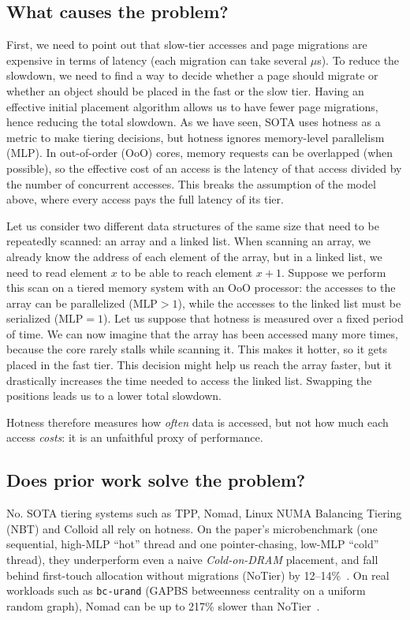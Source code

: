 \documentclass[conference]{IEEEtran}
\begin{document}
\subsection{What causes the problem?}
First, we need to point out that slow-tier accesses and page migrations are expensive in terms of latency (each migration can take several $\mu$s).
To reduce the slowdown, we need to find a way to decide whether a page should migrate or whether an object should be placed in the fast or the slow tier.
Having an effective initial placement algorithm allows us to have fewer page migrations, hence reducing the total slowdown.
As we have seen, SOTA uses hotness as a metric to make tiering decisions, but hotness ignores memory-level parallelism (MLP).
In out-of-order (OoO) cores, memory requests can be overlapped (when possible), so the effective cost of an access is the latency of that access divided by the number of concurrent accesses.
This breaks the assumption of the model above, where every access pays the
full latency of its tier.

Let us consider two different data structures of the same size that need to be repeatedly scanned: an array and a linked list.
When scanning an array, we already know the address of each element of the array, but in a linked list, we need to read element $x$ to be able to reach element $x+1$.
Suppose we perform this scan on a tiered memory system with an OoO processor: the accesses to the array can be parallelized ($\text{MLP} > 1$), while the accesses to the linked list must be serialized ($\text{MLP} = 1$).
Let us suppose that hotness is measured over a fixed period of time. We can now imagine that the array has been accessed many more times, because the core rarely stalls while scanning it. This makes it hotter, so it gets placed in the fast tier.
This decision might help us reach the array faster, but it drastically increases the time needed to access the linked list.
Swapping the positions leads us to a lower total slowdown.


Hotness therefore measures how \emph{often} data is accessed, but not how
much each access \emph{costs}: it is an unfaithful proxy of performance.

\subsection{Does prior work solve the problem?}
No. SOTA tiering systems such as TPP, Nomad, Linux NUMA Balancing Tiering
(NBT) and Colloid all rely on hotness. On the paper's microbenchmark (one
sequential, high-MLP ``hot'' thread and one pointer-chasing, low-MLP ``cold''
thread), they underperform even a naive \emph{Cold-on-DRAM} placement, and
fall behind first-touch allocation without migrations (NoTier) by
12--14\%~\cite{liu2025tiered}. On real workloads such as
\texttt{bc-urand} (GAPBS betweenness centrality on a uniform random graph),
Nomad can be up to 217\% slower than NoTier~\cite{liu2025tiered}.
\end{document}
